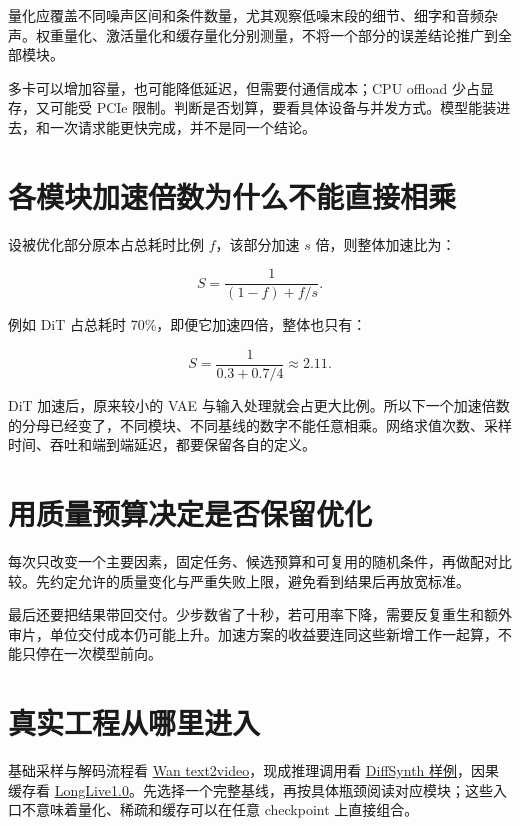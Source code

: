 量化应覆盖不同噪声区间和条件数量，尤其观察低噪末段的细节、细字和音频杂声。权重量化、激活量化和缓存量化分别测量，不将一个部分的误差结论推广到全部模块。

多卡可以增加容量，也可能降低延迟，但需要付通信成本；CPU offload 少占显存，又可能受 PCIe 限制。判断是否划算，要看具体设备与并发方式。模型能装进去，和一次请求能更快完成，并不是同一个结论。

\section{各模块加速倍数为什么不能直接相乘}\label{seedance-m10-ux5404ux6a21ux5757ux52a0ux901fux500dux6570ux4e3aux4ec0ux4e48ux4e0dux80fdux76f4ux63a5ux76f8ux4e58}

设被优化部分原本占总耗时比例 \(f\)，该部分加速 \(s\) 倍，则整体加速比为：

\[
S=\frac{1}{(1-f)+f/s}.
\]

例如 DiT 占总耗时 70\%，即便它加速四倍，整体也只有：

\[
S=\frac{1}{0.3+0.7/4}\approx2.11.
\]

DiT 加速后，原来较小的 VAE 与输入处理就会占更大比例。所以下一个加速倍数的分母已经变了，不同模块、不同基线的数字不能任意相乘。网络求值次数、采样时间、吞吐和端到端延迟，都要保留各自的定义。

\section{用质量预算决定是否保留优化}\label{seedance-m10-ux7528ux8d28ux91cfux9884ux7b97ux51b3ux5b9aux662fux5426ux4fddux7559ux4f18ux5316}

每次只改变一个主要因素，固定任务、候选预算和可复用的随机条件，再做配对比较。先约定允许的质量变化与严重失败上限，避免看到结果后再放宽标准。

最后还要把结果带回交付。少步数省了十秒，若可用率下降，需要反复重生和额外审片，单位交付成本仍可能上升。加速方案的收益要连同这些新增工作一起算，不能只停在一次模型前向。

\section{真实工程从哪里进入}\label{seedance-m10-ux771fux5b9eux5de5ux7a0bux4eceux54eaux91ccux8fdbux5165}

基础采样与解码流程看 \href{https://github.com/Wan-Video/Wan2.1/blob/9737cba9c1c3c4d04b33fcad41c111989865d315/wan/text2video.py}{Wan text2video}，现成推理调用看 \href{https://github.com/modelscope/DiffSynth-Studio/blob/d32f72424cd22bc0ea8100cc57559149b4eac933/examples/wanvideo/model_inference/Wan2.1-T2V-1.3B.py}{DiffSynth 样例}，因果缓存看 \href{https://github.com/NVlabs/LongLive/blob/31c70d9071cd7851d82939806dc9fac645fcabe5/LongLive1.0/pipeline/causal_inference.py}{LongLive1.0}。先选择一个完整基线，再按具体瓶颈阅读对应模块；这些入口不意味着量化、稀疏和缓存可以在任意 checkpoint 上直接组合。
